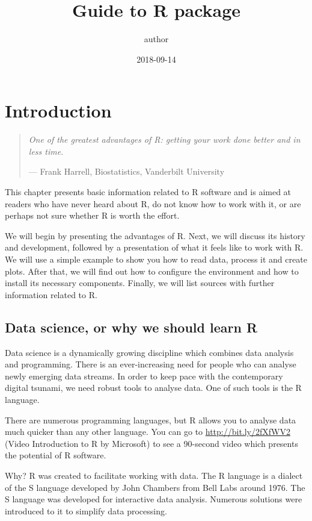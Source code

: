 \documentclass[]{book}
\title{Guide to R package}
\author{author}
\date{2018-09-14}
\theoremstyle{definition}
\theoremstyle{definition}
\theoremstyle{definition}
\theoremstyle{remark}
\begin{document}
\maketitle

{
\hypersetup{linkcolor=black}
\setcounter{tocdepth}{2}
\tableofcontents
}
\chapter{Introduction}\label{part_1}

\begin{quote}
\emph{One of the greatest advantages of R: getting your work done better
and in less time.}

--- Frank Harrell, Biostatistics, Vanderbilt University
\end{quote}

This chapter presents basic information related to R software and is
aimed at readers who have never heard about R, do not know how to work
with it, or are perhaps not sure whether R is worth the effort.

We will begin by presenting the advantages of R. Next, we will discuss
its history and development, followed by a presentation of what it feels
like to work with R. We will use a simple example to show you how to
read data, process it and create plots. After that, we will find out how
to configure the environment and how to install its necessary
components. Finally, we will list sources with further information
related to R.

\section{Data science, or why we should learn R}\label{part_11}

Data science is a dynamically growing discipline which combines data
analysis and programming. There is an ever-increasing need for people
who can analyse newly emerging data streams. In order to keep pace with
the contemporary digital tsunami, we need robust tools to analyse data.
One of such tools is the R language.

There are numerous programming languages, but R allows you to analyse
data much quicker than any other language. You can go to
\url{http://bit.ly/2fXfWV2} (Video Introduction to R by Microsoft) to
see a 90-second video which presents the potential of R software.

Why? R was created to facilitate working with data. The R language is a
dialect of the S language developed by John Chambers from Bell Labs
around 1976. The S language was developed for interactive data analysis.
Numerous solutions were introduced to it to simplify data processing.
\end{document}
